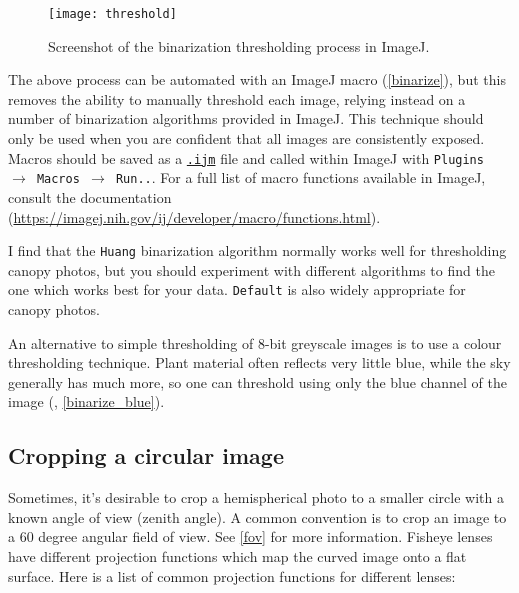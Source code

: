 \documentclass{article}
\newcommand\menu[1]{\texttt{\color{blue}#1}}
\newcommand\file[1]{\texttt{\underline{#1}}}
\begin{document}
\begin{figure}[H]
\centering
	\texttt{[image: threshold]}
	\caption{Screenshot of the binarization thresholding process in ImageJ.}
	\label{threshold}
\end{figure}

The above process can be automated with an ImageJ macro (\autoref{binarize}), but this removes the ability to manually threshold each image, relying instead on a number of binarization algorithms provided in ImageJ. This technique should only be used when you are confident that all images are consistently exposed. Macros should be saved as a \file{.ijm} file and called within ImageJ with \menu{Plugins $\rightarrow$ Macros $\rightarrow$ Run..}. For a full list of macro functions available in ImageJ, consult the documentation (\url{https://imagej.nih.gov/ij/developer/macro/functions.html}). 

\begin{minipage}{\linewidth}

\end{minipage}

I find that the \verb|Huang| \citep{Huang1995} binarization algorithm normally works well for thresholding canopy photos, but you should experiment with different algorithms to find the one which works best for your data. \verb|Default| is also widely appropriate for canopy photos.

An alternative to simple thresholding of 8-bit greyscale images is to use a colour thresholding technique. Plant material often reflects very little blue, while the sky generally has much more, so one can threshold using only the blue channel of the image (\citealt{Brusa2014}, \autoref{binarize_blue}).

\begin{minipage}{\linewidth}

\end{minipage}

\subsection{Cropping a circular image} \label{circle}

Sometimes, it's desirable to crop a hemispherical photo to a smaller circle with a known angle of view (zenith angle). A common convention is to crop an image to a 60 degree angular field of view. See \autoref{fov} for more information. Fisheye lenses have different projection functions which map the curved image onto a flat surface. Here is a list of common projection functions for different lenses:
\end{document}
